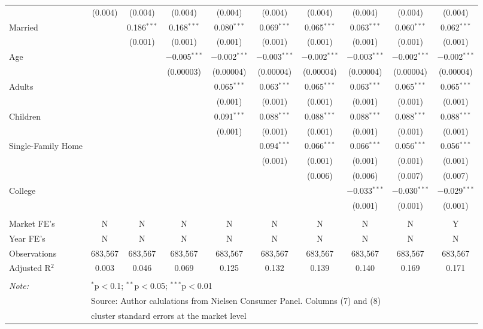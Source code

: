 \begin{table}[!htbp]
\begin{tabular}{@{\extracolsep{5pt}}lccccccccc}
  & (0.004) & (0.004) & (0.004) & (0.004) & (0.004) & (0.004) & (0.004) & (0.004) & (0.004) \\ 
  Married &  & 0.186$^{***}$ & 0.168$^{***}$ & 0.080$^{***}$ & 0.069$^{***}$ & 0.065$^{***}$ & 0.063$^{***}$ & 0.060$^{***}$ & 0.062$^{***}$ \\ 
  &  & (0.001) & (0.001) & (0.001) & (0.001) & (0.001) & (0.001) & (0.001) & (0.001) \\ 
  Age &  &  & $-$0.005$^{***}$ & $-$0.002$^{***}$ & $-$0.003$^{***}$ & $-$0.002$^{***}$ & $-$0.003$^{***}$ & $-$0.002$^{***}$ & $-$0.002$^{***}$ \\ 
  &  &  & (0.00003) & (0.00004) & (0.00004) & (0.00004) & (0.00004) & (0.00004) & (0.00004) \\ 
  Adults &  &  &  & 0.065$^{***}$ & 0.063$^{***}$ & 0.065$^{***}$ & 0.063$^{***}$ & 0.065$^{***}$ & 0.065$^{***}$ \\ 
  &  &  &  & (0.001) & (0.001) & (0.001) & (0.001) & (0.001) & (0.001) \\ 
  Children &  &  &  & 0.091$^{***}$ & 0.088$^{***}$ & 0.088$^{***}$ & 0.088$^{***}$ & 0.088$^{***}$ & 0.088$^{***}$ \\ 
  &  &  &  & (0.001) & (0.001) & (0.001) & (0.001) & (0.001) & (0.001) \\ 
  Single-Family Home &  &  &  &  & 0.094$^{***}$ & 0.066$^{***}$ & 0.066$^{***}$ & 0.056$^{***}$ & 0.056$^{***}$ \\ 
  &  &  &  &  & (0.001) & (0.001) & (0.001) & (0.001) & (0.001) \\ 
  &  &  &  &  &  & (0.006) & (0.006) & (0.007) & (0.007) \\ 
  College &  &  &  &  &  &  & $-$0.033$^{***}$ & $-$0.030$^{***}$ & $-$0.029$^{***}$ \\ 
  &  &  &  &  &  &  & (0.001) & (0.001) & (0.001) \\ 
 \hline \\[-1.8ex] 
Market FE's & N & N & N & N & N & N & N & N & Y \\ 
Year FE's & N & N & N & N & N & N & N & N & N \\ 
Observations & 683,567 & 683,567 & 683,567 & 683,567 & 683,567 & 683,567 & 683,567 & 683,567 & 683,567 \\ 
Adjusted R$^{2}$ & 0.003 & 0.046 & 0.069 & 0.125 & 0.132 & 0.139 & 0.140 & 0.169 & 0.171 \\ 
\hline 
\hline \\[-1.8ex] 
\textit{Note:}  & \multicolumn{9}{l}{$^{*}$p$<$0.1; $^{**}$p$<$0.05; $^{***}$p$<$0.01} \\ 
 & \multicolumn{9}{l}{Source: Author calulations from Nielsen Consumer Panel. Columns (7) and (8) } \\ 
 & \multicolumn{9}{l}{cluster standard errors at the market level} \\ 
\end{tabular} 
\end{table} 
